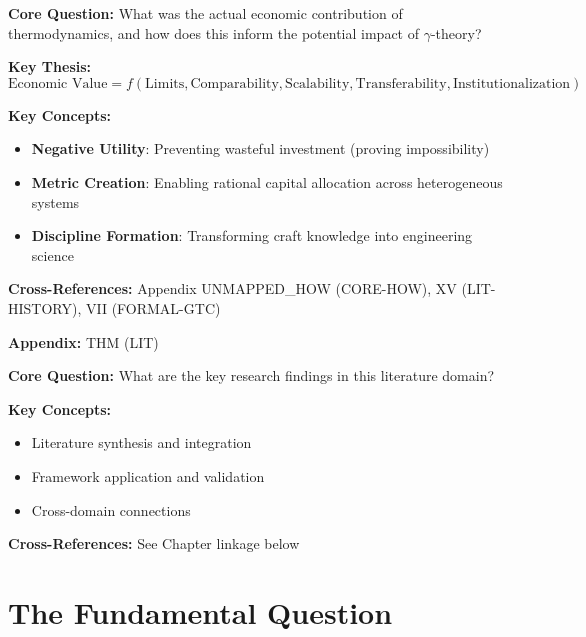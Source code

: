 \begin{tcolorbox}[colback=blue!5!white, colframe=blue!75!black,
    title=Quick Reference: Thermodynamics Economic Impact]

\textbf{Core Question:} What was the actual economic contribution of thermodynamics,
and how does this inform the potential impact of $\gamma$-theory?

\textbf{Key Thesis:}
\begin{equation}
\text{Economic Value} = f(\text{Limits}, \text{Comparability}, \text{Scalability}, \text{Transferability}, \text{Institutionalization})
\end{equation}

\textbf{Key Concepts:}
\begin{itemize}[nosep]
\item \textbf{Negative Utility}: Preventing wasteful investment (proving impossibility)
\item \textbf{Metric Creation}: Enabling rational capital allocation across heterogeneous systems
\item \textbf{Discipline Formation}: Transforming craft knowledge into engineering science
\end{itemize}

\textbf{Cross-References:} Appendix UNMAPPED_HOW (CORE-HOW), XV (LIT-HISTORY), VII (FORMAL-GTC)
\end{tcolorbox}



\begin{tcolorbox}[colback=blue!5!white, colframe=blue!75!black,
    title=Quick Reference: Appendix UNMAPPED_THM]
\textbf{Appendix:} THM (LIT)

\textbf{Core Question:} What are the key research findings in this literature domain?

\textbf{Key Concepts:}
\begin{itemize}[nosep]
\item Literature synthesis and integration
\item Framework application and validation
\item Cross-domain connections
\end{itemize}

\textbf{Cross-References:} See Chapter linkage below
\end{tcolorbox}

\section{The Fundamental Question}
\label{sec:thermo-fundamental}

